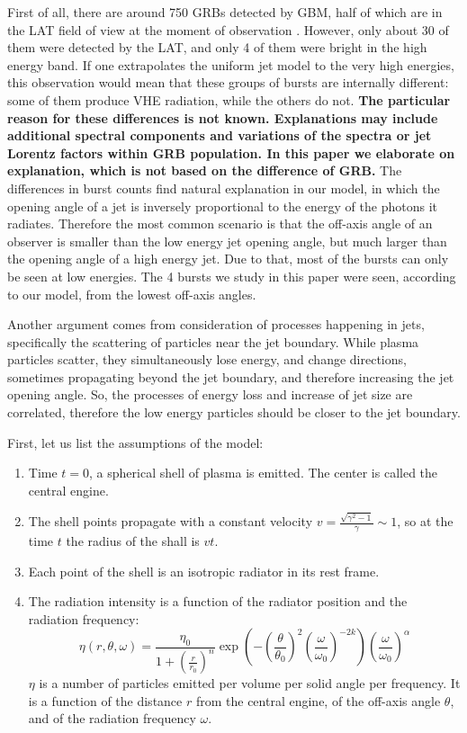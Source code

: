 \documentclass[manuscript]{aastex}
\begin{document}
First of all, there are around 750 GRBs detected by GBM, half of which
are in the LAT field of view at the moment of observation
\citep{Vianello:2013ela}.  However, only about 30 of them were detected
by the LAT, and only 4 of them were bright in the high energy band.
If one extrapolates the uniform jet model to the very high energies,
this observation would mean that these groups of bursts are internally
different: some of them produce VHE radiation, while the others do
not. {\bf The particular reason for these differences is not
  known. Explanations may include additional spectral components and
  variations of the spectra or jet Lorentz factors within GRB
  population. In this paper we elaborate on explanation, which is not
  based on the difference of GRB. 
}  
The differences in
burst counts find natural explanation in our model, in which the
opening angle of a jet is inversely proportional to the energy of the
photons it radiates.  Therefore the most common scenario is that the
off-axis angle of an observer is smaller than the low energy jet
opening angle, but much larger than the opening angle of a high energy
jet.  Due to that, most of the bursts can only be seen at low
energies.  The 4 bursts we study in this paper were seen, according to
our model, from the lowest off-axis angles.

Another argument comes from consideration of processes happening in
jets, specifically the scattering of particles near the jet boundary.
While plasma particles scatter, they simultaneously lose energy, and
change directions, sometimes propagating beyond the jet boundary, and
therefore increasing the jet opening angle.  So, the processes of
energy loss and increase of jet size are correlated, therefore the low
energy particles should be closer to the jet boundary.

First, let us list the assumptions of the model:

\begin{enumerate}
\item{Time $t = 0$, a spherical shell of plasma is emitted. The center
  is called the central engine.}
\item{The shell points propagate with a constant velocity $v =
  \frac{\sqrt{\gamma^2 - 1}}{\gamma} \sim 1$, so at the time $t$ the
  radius of the shall is $v t$.}
\item{Each point of the shell is an isotropic radiator in its rest
  frame.}
\item{ The radiation intensity is a function of the radiator position
  and the radiation frequency:
	\begin{equation}\label{eq:eta}
		\eta\left(r,\theta,\omega\right) = 
		\frac{\eta_0}{1 + \left(\frac{r}{r_0}\right)^n}
		\exp\left(
			-\left(\frac{\theta}{\theta_0}\right)^2
			\left(\frac{\omega}{\omega_0}\right)^{-2k}
		\right)
		\left(\frac{\omega}{\omega_0}\right)^\alpha
	\end{equation}
	$\eta$ is a number of particles emitted per volume per solid
        angle per frequency. It is a function of the distance $r$ from
        the central engine, of the off-axis angle $\theta$, and of the
        radiation frequency $\omega$.  }
\end{enumerate}
\end{document}
